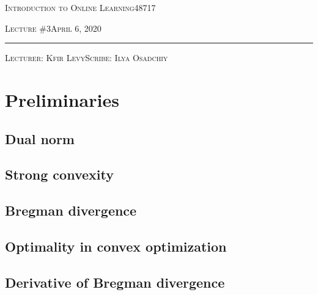 \documentclass[11pt]{article}
\theoremstyle{definition}
\theoremstyle{definition}
\def \lecturenum  {3}
\def \lecturedate {April 6, 2020}
\def \scribe      {Ilya Osadchiy}
\begin{document}
\noindent
\begin{minipage}[t]{1\columnwidth}%
\textsc{Introduction to Online Learning}\hspace*{\fill}48717
\vspace{2mm}

\textsc{\LARGE Lecture \#\lecturenum}\hspace*{\fill}\textsc{\lecturedate}

\noindent \rule[0.5ex]{1\linewidth}{1pt}

\textsc{Lecturer: Kfir Levy\hspace*{\fill}Scribe: \scribe}
\vspace{10mm}
\end{minipage}














\section{Preliminaries}

\subsection{Dual norm}

\subsection{Strong convexity}

\subsection{Bregman divergence}

\subsection{Optimality in convex optimization}

\subsection{Derivative of Bregman divergence}
\end{document}
